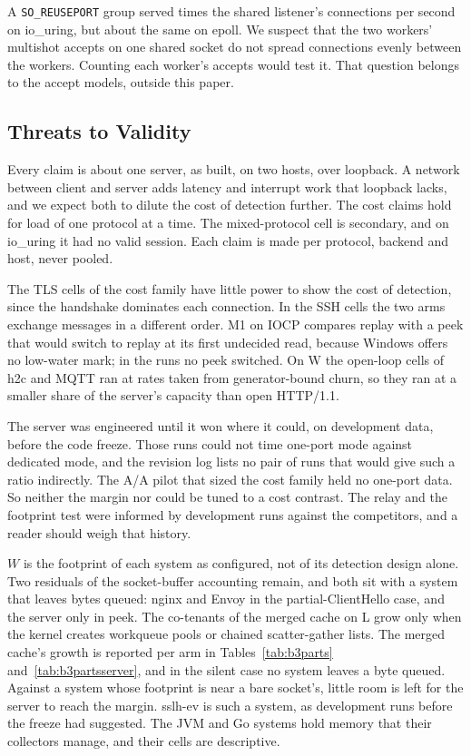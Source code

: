  A \texttt{SO\_REUSEPORT} group served
\SecTwoCoresSecTwoCoresCOneLIouringReuseportValueMedian{} times the shared listener's connections
per second on io\_uring, but about the same on epoll. We suspect that the two workers' multishot
accepts on one shared socket do not spread connections evenly between the workers. Counting each
worker's accepts would test it. That question belongs to the accept models, outside this paper.

\subsection{Threats to Validity}\label{sec:threats}

 Every claim is about one server, as built, on two hosts, over loopback. A network
between client and server adds latency and interrupt work that loopback lacks, and we expect both to
dilute the cost of detection further. The cost claims hold for load of one protocol at a time. The
mixed-protocol cell is secondary, and on io\_uring it had no valid session. Each claim is made per
protocol, backend and host, never pooled.

 The TLS cells of the cost family have little power to show the cost
of detection, since the handshake dominates each connection. In the SSH cells the two arms exchange
messages in a different order. M1 on IOCP compares replay with a peek that would switch to replay at
its first undecided read, because Windows offers no low-water mark; in the runs no peek switched. On
W the open-loop cells of h2c and MQTT ran at rates taken from generator-bound churn, so they ran at
a smaller share of the server's capacity than open HTTP/1.1.

 The server was engineered until it won where it could, on
development data, before the code freeze. Those runs could not time one-port mode against dedicated
mode, and the revision log lists no pair of runs that would give such a ratio indirectly. The A/A
pilot that sized the cost family held no one-port data. So neither the margin nor \RC{} could be
tuned to a cost contrast. The relay and the footprint test were informed by development runs
against the competitors, and a reader should weigh that history.

 $W$ is the footprint of each system as configured, not of its detection
design alone. Two residuals of the socket-buffer accounting remain, and both sit with a system that
leaves bytes queued: nginx and Envoy in the partial-ClientHello case, and the server only in peek.
The co-tenants of the merged cache on L grow only when the kernel creates workqueue pools or chained
scatter-gather lists. The merged cache's growth is reported per arm in
Tables~\ref{tab:b3parts} and~\ref{tab:b3partsserver}, and in the silent case no system leaves a byte
queued. Against a system whose footprint is near a bare socket's, little room is left for the
server to reach the margin. sslh-ev is such a system, as development runs before the freeze had
suggested.
The
JVM and Go systems hold memory that their collectors manage, and their cells are descriptive.

